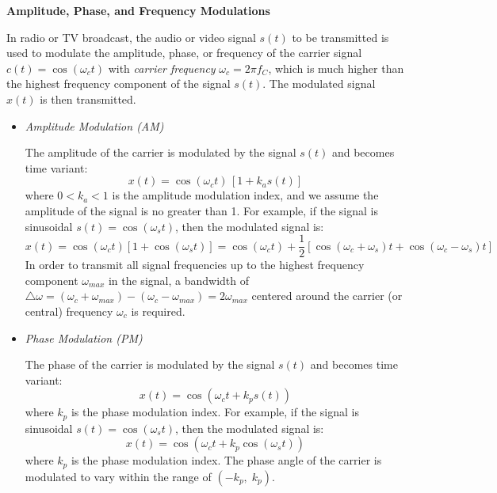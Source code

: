 \documentclass{article}
\begin{document}

{\bf Amplitude, Phase, and Frequency Modulations}

In radio or TV broadcast, the audio or video signal $s(t)$ to be transmitted 
is used to modulate the amplitude, phase, or frequency of the carrier signal 
$c(t)=\cos(\omega_c t)$ with {\em carrier frequency} $\omega_c=2\pi f_C$, which
is much higher than the highest frequency component of the signal $s(t)$. The 
modulated signal $x(t)$ is then transmitted.

\begin{itemize}
\item {\em Amplitude Modulation (AM)}

  The amplitude of the carrier is modulated by the signal $s(t)$ and becomes 
  time variant:
  \begin{equation} 
    x(t)=\cos(\omega_c t)\,[1+k_a s(t)]
  \end{equation}  
  where $0<k_a<1$ is the amplitude modulation index, and we assume the 
  amplitude of the signal is no greater than 1. For example, if the signal
  is sinusoidal $s(t)=\cos(\omega_s t)$, then the modulated signal is:
  \begin{equation} 
    x(t)=\cos(\omega_ct)[1+\cos(\omega_st)]
    =\cos(\omega_ct)+\frac{1}{2}[\cos(\omega_c+\omega_s)t+\cos(\omega_c-\omega_s)t] 
  \end{equation}
  In order to transmit all signal frequencies up to the highest frequency
  component $\omega_{max}$ in the signal, a bandwidth of 
  $\triangle\omega=(\omega_c+\omega_{max})-(\omega_c-\omega_{max})=2\omega_{max}$ 
  centered around the carrier (or central) frequency $\omega_c$ is required.  

\item {\em Phase Modulation (PM)}
  
  The phase of the carrier is modulated by the signal $s(t)$ and becomes
  time variant:
  \begin{equation}
    x(t)=\cos(\omega_ct+k_p s(t))
  \end{equation}
  where $k_p$ is the phase modulation index. For example, if the signal is 
  sinusoidal $s(t)=\cos(\omega_s t)$, then the modulated signal is:
  \begin{equation} 
    x(t)=\cos(\omega_ct+k_p \cos(\omega_st))
  \end{equation}
  where $k_p$ is the phase modulation index. The phase angle of the carrier 
  is modulated to vary within the range of $(-k_p,\;k_p)$.


\end{itemize}
\end{document}
